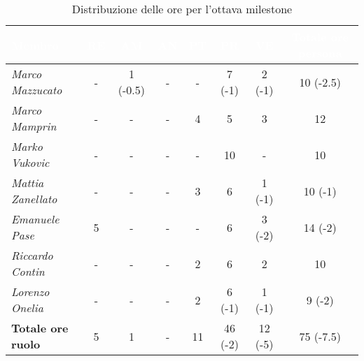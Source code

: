 \begin{table}[H]
    \renewcommand\arraystretch{1.5}
    \small
    \centering
        \begin{tabular}{|l|c|c|c|c|c|c|c|}
            \hline
            \rowcolor[HTML]{036400}
            \textcolor{white}{\textbf{Membro}} & \multicolumn{1}{c|}{\textcolor{white}{\textbf{RE}}} & \multicolumn{1}{c|}{\textcolor{white}{\textbf{AM}}} & \multicolumn{1}{c|}{\textcolor{white}{\textbf{AN}}} & \multicolumn{1}{c|}{\textcolor{white}{\textbf{PT}}} & \multicolumn{1}{c|}{\textcolor{white}{\textbf{PR}}} & \multicolumn{1}{c|}{\textcolor{white}{\textbf{VE}}} & \multicolumn{1}{c|}{\textcolor{white}{\textbf{Totale ore persona}}} \\ \hline
            \rowcolor[HTML]{EFEFEF}\textit{Marco Mazzucato}  & -         & 1 (-0.5)   & -          & -      & 7 (-1)   & 2 (-1)    & 10 (-2.5)    \\ \hline
            \rowcolor[HTML]{C0C0C0}\textit{Marco Mamprin}    & -         & -          & -          & 4      & 5        & 3         & 12           \\ \hline
            \rowcolor[HTML]{EFEFEF}\textit{Marko Vukovic}    & -         & -          & -          & -      & 10       & -         & 10           \\ \hline
            \rowcolor[HTML]{C0C0C0}\textit{Mattia Zanellato} & -         & -          & -          & 3      & 6        & 1 (-1)    & 10 (-1)      \\ \hline
            \rowcolor[HTML]{EFEFEF}\textit{Emanuele Pase}    & 5         & -          & -          & -      & 6        & 3 (-2)    & 14 (-2)      \\ \hline
            \rowcolor[HTML]{C0C0C0}\textit{Riccardo Contin}  & -         & -          & -          & 2      & 6        & 2         & 10           \\ \hline
            \rowcolor[HTML]{EFEFEF}\textit{Lorenzo Onelia}   & -         & -          & -          & 2      & 6 (-1)   & 1 (-1)    & 9 (-2)       \\ \hline
            \rowcolor[HTML]{C0C0C0}\textbf{Totale ore ruolo} & 5         & 1          & -          & 11     & 46 (-2)  & 12 (-5)   & 75 (-7.5)  \\ \hline
        \end{tabular}
    \caption{Distribuzione delle ore per l'ottava milestone}
\end{table}

